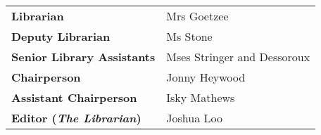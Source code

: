 \vspace{1.15em}

\begin{tabular}{ p{4cm} p{4.2cm} }
	\textbf{Librarian} & Mrs Goetzee \\
	\textbf{Deputy Librarian} & Ms Stone \\
	\textbf{Senior Library Assistants} & Mses Stringer and Dessoroux \\
	\textbf{Chairperson} & Jonny Heywood \\
	\textbf{Assistant Chairperson} & Isky Mathews \\
	\textbf{Editor (\textit{The Librarian})} & Joshua Loo \\
\end{tabular}